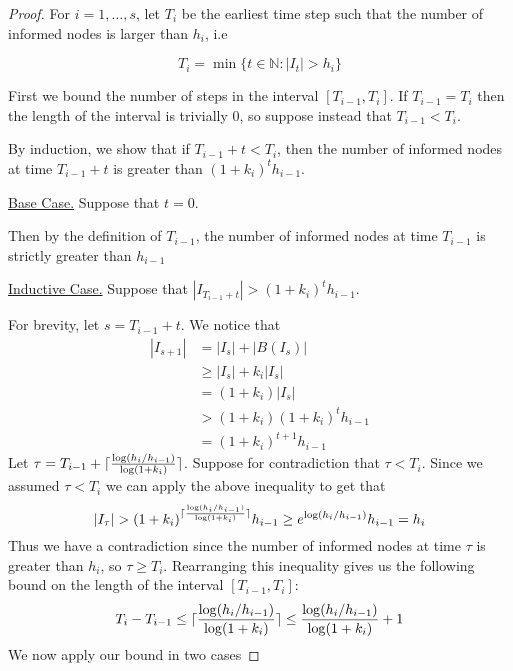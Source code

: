 \begin{proof}
	For $i = 1,\dots, s$, let $T_i$ be the earliest time step such that the number of informed nodes is larger than $h_i$, i.e

	$$
		T_i = \min \{ t \in \mathbb{N} : |I_t| > h_i \}
	$$

	First we bound the number of steps in the interval $[T_{i-1}, T_i]$. If $T_{i-1} = T_i$ then the length of the interval is trivially 0, so suppose instead that $T_{i-1} < T_i$.

	By induction, we show that if $T_{i-1} + t < T_i$, then the number of informed nodes at time $T_{i-1} + t$ is greater than $(1+k_i)^t h_{i-1}$.
	
	\underline{Base Case.} Suppose that $t=0$. 
	
	Then by the definition of $T_{i-1}$, the number of informed nodes at time $T_{i-1}$ is strictly greater than $h_{i-1}$

	\underline{Inductive Case.} Suppose that $|I_{T_{i-1} + t}| > (1+k_i)^t h_{i-1}$.

	For brevity, let $s = T_{i-1} + t$. We notice that 
	\begin{align*}
		|I_{s+1}| &= |I_s| + |B(I_s)| \\ %
		& \geq |I_s| + k_i |I_s| \\ %
		& = (1 + k_i)|I_s| \\
		& > (1 + k_i)(1+k_i)^t h_{i-1} \\ %
		& = (1+k_i)^{t+1} h_{i-1}
	\end{align*}
	Let $\tau = T_{i-1} + \lceil \frac{\log (h_i/h_{i-1})}{\log(1+k_i)}\rceil$. 
	Suppose for contradiction that $\tau < T_i$. %
	Since we assumed $\tau < T_i$ we can apply the above inequality %
	to get that 
	$$
		|I_\tau| > 
		(1+k_i)^{\lceil \frac{\log (h_i/h_{i-1})}{\log(1+k_i)}\rceil} h_{i-1}
		\geq e^{\log (h_i/h_{i-1})} h_{i-1}
		= h_i
	$$
	Thus we have a contradiction since the number of informed nodes at time $\tau$ is greater than $h_i$, so $\tau \geq T_i$. Rearranging this inequality gives us the following bound on the length of the interval $[T_{i-1}, T_i]$:
	\begin{equation} \label{eq:FloodingSingleStepBound}
		T_i - T_{i-1} \leq \lceil \frac{\log (h_i/h_{i-1})}{\log(1+k_i)}\rceil \leq \frac{\log (h_i/h_{i-1})}{\log(1+k_i)} + 1
	\end{equation}
	We now apply our bound in two cases


\end{proof}
